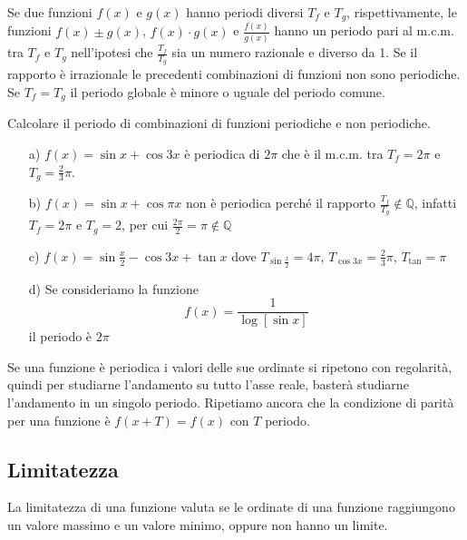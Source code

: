 Se due funzioni $f(x)$ e $g(x)$ hanno periodi diversi $T_f$ e $T_g$, 
rispettivamente, le funzioni $f(x)\pm g(x)$, $f(x)\cdot g(x)$ e 
$\frac{f(x)}{g(x)}$ hanno un periodo pari al m.c.m. tra $T_f$ e $T_g$ 
nell'ipotesi che $\frac{T_f}{T_g}$ sia un numero razionale e diverso da 1. Se 
il rapporto è irrazionale le precedenti combinazioni di funzioni non sono 
periodiche. Se $T_f=T_g$ il periodo globale è minore o uguale del periodo 
comune.\\

\begin{esempio} Calcolare il periodo di combinazioni di funzioni periodiche e 
non periodiche.\\
  \begin{itemize}
  \item[a)] $f(x)=\sin x+\cos 3x$ è periodica di $2\pi$ che è 
il m.c.m. tra $T_f=2\pi$ e $T_g=\frac{2}{3}\pi$.
  
  \item[b)] $f(x)=\sin x+\cos \pi x$ non è periodica perché il 
rapporto $\frac{T_f}{T_g}\notin \mathbb{Q}$, infatti $T_f=2\pi$ e $T_g=2$, 
per cui $\frac{2\pi}{2}=\pi\notin\mathbb{Q}$
  
  \item[c)] $f(x)=\sin \frac{x}{2}-\cos 3x+\tan x$ dove 
$T_{\sin \frac{x}{2}}=4\pi$, $T_{\cos 3x}=\frac{2}{3}\pi$, $T_{\tan}=\pi$
  
  \item[d)] Se consideriamo la funzione 
$$f(x)=\frac{1}{\log[\sin x]}$$ il periodo è $2\pi$
\end{itemize}
\end{esempio}

Se una funzione è periodica i valori delle sue ordinate si ripetono con 
regolarità, quindi per studiarne l'andamento su tutto l'asse reale, basterà 
studiarne l'andamento in un singolo periodo. Ripetiamo ancora che la 
condizione di parità per una funzione è $f(x+T)=f(x)$ con $T$ periodo.
%
%
\subsection{Limitatezza}
La limitatezza di una funzione valuta se le ordinate di una funzione 
raggiungono un valore massimo e un valore minimo, oppure non hanno un 
limite.\\


